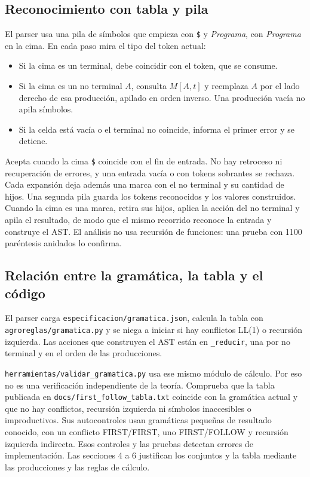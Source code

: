 \documentclass[11pt,a4paper]{article}
\newcommand{\tk}[1]{\texttt{#1}}
\newcommand{\nt}[1]{\textit{#1}}
\begin{document}
\subsection{Reconocimiento con tabla y pila}

El parser usa una pila de símbolos que empieza con \tk{\$} y
\nt{Programa}, con \nt{Programa} en la cima. En cada paso mira el
tipo del token actual:

\begin{itemize}
  \item Si la cima es un terminal, debe coincidir con el token, que
    se consume.
  \item Si la cima es un no terminal $A$, consulta $M[A, t]$ y
    reemplaza $A$ por el lado derecho de esa producción, apilado en
    orden inverso. Una producción vacía no apila símbolos.
  \item Si la celda está vacía o el terminal no coincide, informa
    el primer error y se detiene.
\end{itemize}

Acepta cuando la cima \tk{\$} coincide con el fin de entrada. No
hay retroceso ni recuperación de errores, y una entrada vacía o con
tokens sobrantes se rechaza. Cada expansión deja además una marca
con el no terminal y su cantidad de hijos. Una segunda pila guarda
los tokens reconocidos y los valores construidos. Cuando la cima es
una marca, retira sus hijos, aplica la acción del no terminal y
apila el resultado, de modo que el mismo recorrido reconoce la
entrada y construye el AST. El análisis no usa recursión de
funciones: una prueba con 1100 paréntesis anidados lo confirma.

\subsection{Relación entre la gramática, la tabla y el código}

El parser carga \texttt{especificacion/gramatica.json}, calcula la
tabla con \texttt{agroreglas/gramatica.py} y se niega a iniciar si
hay conflictos LL(1) o recursión izquierda. Las acciones que
construyen el AST están en \texttt{\_reducir}, una por no terminal
y en el orden de las producciones.

\texttt{herramientas/validar\_gramatica.py} usa ese mismo módulo de
cálculo. Por eso no es una verificación independiente de la teoría.
Comprueba que la tabla publicada en
\texttt{docs/first\_follow\_tabla.txt} coincide con la gramática
actual y que no hay conflictos, recursión izquierda ni símbolos
inaccesibles o improductivos. Sus autocontroles usan gramáticas
pequeñas de resultado conocido, con un conflicto FIRST/FIRST, uno
FIRST/FOLLOW y recursión izquierda indirecta. Esos controles y las
pruebas detectan errores de implementación. Las secciones 4 a 6
justifican los conjuntos y la tabla mediante las producciones y
las reglas de cálculo.
\end{document}
